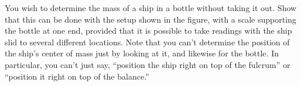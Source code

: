 You wish to determine the mass of a ship in a bottle
without taking it out. Show that this can be done with the
setup shown in the figure, with a scale supporting the
bottle at one end, provided that it is possible to take
readings with the ship slid to several different locations.
Note that you can't determine the position of the ship's center of mass
just by looking at it, and likewise for the bottle.
In particular, you can't just say, 
``position the ship right on top of the fulcrum'' or
``position it right on top of the balance.''
